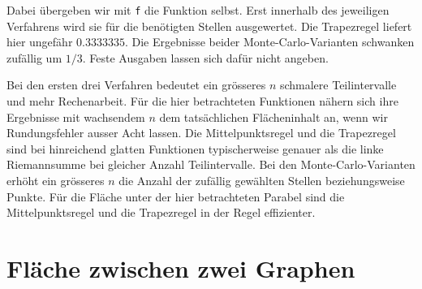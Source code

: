 Dabei übergeben wir mit \lstinline|f| die Funktion selbst. Erst innerhalb des jeweiligen Verfahrens wird sie für die benötigten Stellen ausgewertet.
Die Trapezregel liefert hier ungefähr $0.3333335$. Die Ergebnisse beider Monte-Carlo-Varianten schwanken zufällig um $1/3$. Feste Ausgaben lassen sich dafür nicht angeben.

\begin{mysummary}
Bei den ersten drei Verfahren bedeutet ein grösseres $n$ schmalere Teilintervalle und mehr Rechenarbeit. Für die hier betrachteten Funktionen nähern sich ihre Ergebnisse mit wachsendem $n$ dem tatsächlichen Flächeninhalt an, wenn wir Rundungsfehler ausser Acht lassen.
Die Mittelpunktsregel und die Trapezregel sind bei hinreichend glatten Funktionen typischerweise genauer als die linke Riemannsumme bei gleicher Anzahl Teilintervalle.
Bei den Monte-Carlo-Varianten erhöht ein grösseres $n$ die Anzahl der zufällig gewählten Stellen beziehungsweise Punkte. Für die Fläche unter der hier betrachteten Parabel sind die Mittelpunktsregel und die Trapezregel in der Regel effizienter.
\end{mysummary}

\section{Fläche zwischen zwei Graphen}


